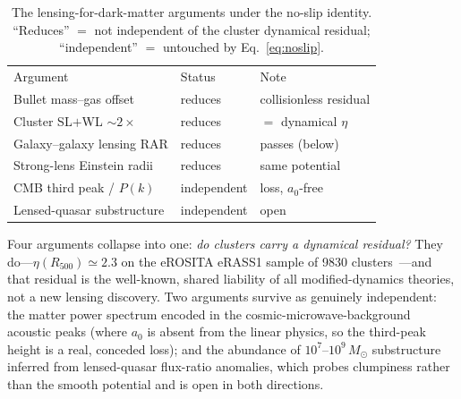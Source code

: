 \documentclass[aps,prd,twocolumn,10pt,nofootinbib,superscriptaddress]{revtex4-2}
\begin{document}
\begin{table}[t]
\caption{The lensing-for-dark-matter arguments under the no-slip identity. ``Reduces'' $=$ not independent of the
cluster dynamical residual; ``independent'' $=$ untouched by Eq.~\eqref{eq:noslip}.}
\label{tab:reframe}
\begin{ruledtabular}
\begin{tabular}{lll}
Argument & Status & Note \\
\colrule
Bullet mass--gas offset & reduces & collisionless residual \\
Cluster SL$+$WL $\sim2\times$ & reduces & $=$ dynamical $\eta$ \\
Galaxy--galaxy lensing RAR & reduces & passes (below) \\
Strong-lens Einstein radii & reduces & same potential \\
CMB third peak / $P(k)$ & independent & loss, $a_0$-free \\
Lensed-quasar substructure & independent & open \\
\end{tabular}
\end{ruledtabular}
\end{table}

Four arguments collapse into one: \emph{do clusters carry a dynamical residual?} They do---$\eta(R_{500})\!\simeq\!2.3$
on the eROSITA eRASS1 sample of 9830 clusters~\cite{Bulbul2024}---and that residual is the well-known, shared
liability of all modified-dynamics theories, not a new lensing discovery. Two arguments survive as genuinely
independent: the matter power spectrum encoded in the cosmic-microwave-background acoustic peaks (where $a_0$ is
absent from the linear physics, so the third-peak height is a real, conceded loss); and the abundance of
$10^7$--$10^9\,M_\odot$ substructure inferred from lensed-quasar flux-ratio anomalies, which probes clumpiness rather
than the smooth potential and is open in both directions.
\end{document}
